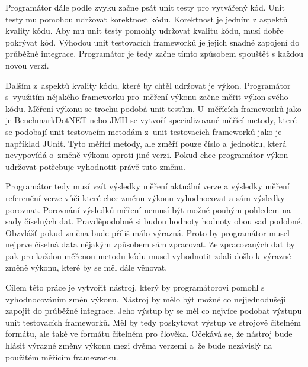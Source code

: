 Programátor dále podle zvyku začne psát unit testy pro vytvářený kód. Unit testy mu pomohou udržovat korektnost kódu.
Korektnost je jedním z aspektů kvality kódu. Aby mu unit testy pomohly udržovat kvalitu kódu, musí dobře pokrývat kód.
Výhodou unit testovacích frameworků je jejich snadné zapojení do průběžné integrace. Programátor je tedy začne
tímto způsobem spouštět s každou novou verzí.

Dalším z~aspektů kvality kódu, které by chtěl udržovat je výkon. Programátor s~využitím nějakého frameworku pro~měření výkonu začne měřit výkon svého kódu.
Měření výkonu se trochu podobá unit testům. U~měřících frameworků jako je BenchmarkDotNET nebo JMH se vytvoří specializované měřící metody,
které se podobají unit testovacím metodám z~unit testovacích frameworků jako je například JUnit.
Tyto měřící metody, ale změří pouze číslo a~jednotku, která nevypovídá o~změně výkonu oproti jiné verzi.
Pokud chce programátor výkon udržovat potřebuje vyhodnotit právě tuto změnu.

Programátor tedy musí vzít výsledky měření aktuální verze a výsledky měření referenční verze vůči které chce
změnu výkonu vyhodnocovat a sám výsledky porovnat. Porovnání výsledků měření nemusí být možné pouhým pohledem
na sady číselných dat. Pravděpodobně si budou hodnoty hodnoty obou sad podobné. Obzvlášť pokud změna bude příliš málo výrazná.
Proto by programátor musel nejprve číselná data nějakým způsobem sám zpracovat. Ze zpracovaných dat by pak pro každou měřenou metodu
kódu musel vyhodnotit zdali došlo k výrazné změně výkonu, které by se měl dále věnovat.

Cílem této práce je vytvořit nástroj, který by programátorovi pomohl s vyhodnocováním změn výkonu.
Nástroj by mělo být možné co nejjednodušeji zapojit do průběžné integrace. Jeho výstup by se měl co nejvíce podobat
výstupu unit testovacích frameworků. Měl by tedy poskytovat výstup ve strojově čitelném formátu, ale také ve formátu
čitelném pro člověka. Očekává se, že nástroj bude hlásit výrazné změny výkonu mezi dvěma verzemi a~že bude nezávislý
na použitém měřícím frameworku.





